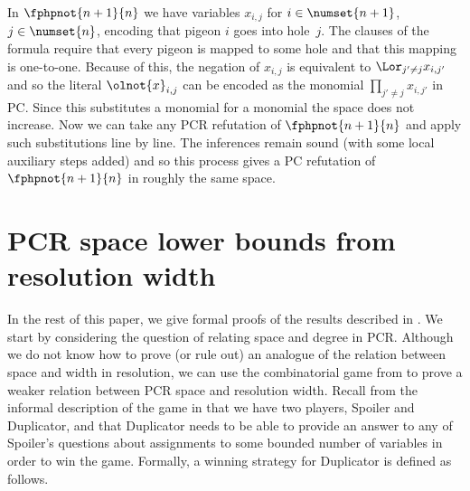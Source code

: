 \documentclass{toc}
\begin{document}
\begin{ourproof}[sketch]
  In
%
  $\fphpnot{n+1}{n}$
  we have variables
  $x_{i,j}$
  for
%
  $i \in \numset{n+1}$,
  $j \in \numset{n}$,
%
  encoding that pigeon $i$ goes into hole~$j$. The clauses of the
  formula require that every pigeon is mapped to some hole and that
  this mapping is one-to-one.
  Because of this, the negation of
  $x_{i,j}$
  is equivalent to 
  $\Lor_{j'\neq j} x_{i,j'}$
  and so the literal
  $\olnot{x}_{i,j}$
  can be encoded as the monomial
  $\prod_{j'\not=j} x_{i,j'}$
  in PC.
  Since this substitutes a monomial for a monomial the space does not
  increase. 
  Now we can take any PCR refutation of
  $\fphpnot{n+1}{n}$
%
  and apply such substitutions line by line.
  The inferences remain sound (with some local auxiliary steps added)
  and so this process gives a PC refutation of
  $\fphpnot{n+1}{n}$ 
%
  in roughly the same space.
%
%
%
%
%
%
%
%
%
\end{ourproof}

 
%
\section{PCR space lower bounds from resolution width}%
%
\label{sec:substitution}

In the rest of this paper, 
we give formal proofs of the results described in
.
We start by considering  the question of relating space and degree
in PCR\@. Although we do not know how to prove (or rule out) an analogue
of the relation between space and width in resolution, 
we can use the combinatorial game from
\cite{AD08CombinatoricalCharacterization} 
to prove a weaker relation between PCR space and resolution width. Recall
from the informal description of the game in
 that we have two players, Spoiler and
Duplicator, and that Duplicator needs to be able to provide an
answer to any of Spoiler's questions about assignments to some
bounded number of variables in order to win the game. Formally, a
winning strategy for Duplicator is defined as follows.
\end{document}
